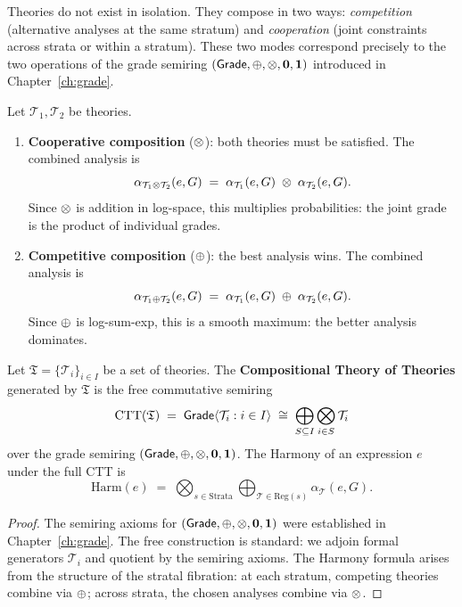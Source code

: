 Theories do not exist in isolation.  They compose in two ways:
\emph{competition} (alternative analyses at the same stratum) and
\emph{cooperation} (joint constraints across strata or within a
stratum).  These two modes correspond precisely to the two operations
of the grade semiring $(\mathsf{Grade}, \oplus, \otimes, \mathbf{0}, \mathbf{1})$
introduced in Chapter~\ref{ch:grade}.

\begin{definition}
\label{def:theory-composition}
Let $\mathcal{T}_1, \mathcal{T}_2$ be theories.
\begin{enumerate}[label=(\alph*)]
\item \textbf{Cooperative composition} ($\otimes$):  both theories must
  be satisfied.  The combined analysis is
  \[
    \alpha_{\mathcal{T}_1 \otimes \mathcal{T}_2}(e, G)
    \;=\; \alpha_{\mathcal{T}_1}(e, G)
    \;\otimes\; \alpha_{\mathcal{T}_2}(e, G).
  \]
  Since $\otimes$ is addition in log-space, this multiplies
  probabilities: the joint grade is the product of individual grades.

\item \textbf{Competitive composition} ($\oplus$):  the best analysis
  wins.  The combined analysis is
  \[
    \alpha_{\mathcal{T}_1 \oplus \mathcal{T}_2}(e, G)
    \;=\; \alpha_{\mathcal{T}_1}(e, G)
    \;\oplus\; \alpha_{\mathcal{T}_2}(e, G).
  \]
  Since $\oplus$ is log-sum-exp, this is a smooth maximum: the better
  analysis dominates.
\end{enumerate}
\end{definition}

\begin{theorem}
\label{thm:free-semiring}
Let $\mathfrak{T} = \{\mathcal{T}_i\}_{i \in I}$ be a set of
theories.  The \textbf{Compositional Theory of Theories} generated
by $\mathfrak{T}$ is the free commutative semiring
\[
  \mathrm{CTT}(\mathfrak{T})
  \;=\; \mathsf{Grade}\langle \mathcal{T}_i : i \in I \rangle
  \;\cong\; \bigoplus_{S \subseteq I}
  \bigotimes_{i \in S} \mathcal{T}_i
\]
over the grade semiring $(\mathsf{Grade}, \oplus, \otimes, \mathbf{0}, \mathbf{1})$.
The Harmony of an expression $e$ under the full CTT is
\[
  \mathrm{Harm}(e) \;=\; \bigotimes_{s \in \mathrm{Strata}}
  \bigoplus_{\mathcal{T} \in \mathrm{Reg}(s)}
  \alpha_{\mathcal{T}}(e, G).
\]
\end{theorem}

\begin{proof}
The semiring axioms for $(\mathsf{Grade}, \oplus, \otimes, \mathbf{0}, \mathbf{1})$ were
established in Chapter~\ref{ch:grade}.  The free construction is
standard: we adjoin formal generators $\mathcal{T}_i$ and quotient
by the semiring axioms.  The Harmony formula arises from the
structure of the stratal fibration: at each stratum, competing
theories combine via $\oplus$; across strata, the chosen analyses
combine via $\otimes$.
\end{proof}

